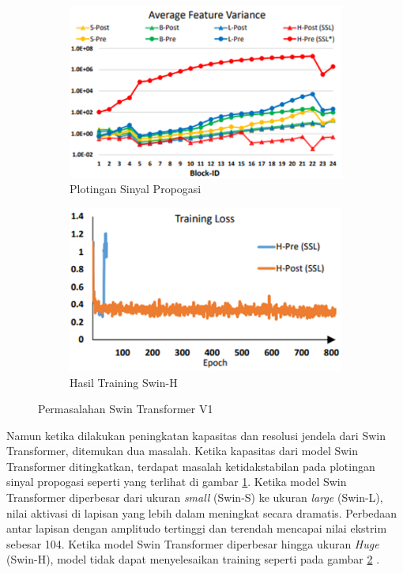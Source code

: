 \begin{figure}[h!]
  \centering
  \begin{subfigure}{.5\textwidth}
    \centering
    \includegraphics[width=.9\linewidth]{gambar/issue1SwinV1.png}
    \caption{Plotingan Sinyal Propogasi}
    \label{fig:plotingansinyalpropogasi}
  \end{subfigure}%
  \begin{subfigure}{.5\textwidth}
    \centering
    \includegraphics[width=.9\linewidth]{gambar/Issue2SwinV1.png}
    \caption{Hasil Training Swin-H}
    \label{fig:hasiltrainingswinh}
  \end{subfigure}
  \caption{Permasalahan Swin Transformer V1}
  \label{fig:permasalahanswintransformerv1}
\end{figure}

Namun ketika dilakukan peningkatan kapasitas dan resolusi jendela dari Swin \linebreak Transformer, ditemukan dua masalah. Ketika kapasitas dari model Swin Transformer \linebreak ditingkatkan, terdapat masalah ketidakstabilan 
pada plotingan sinyal propogasi seperti yang terlihat di gambar \ref{fig:plotingansinyalpropogasi}. Ketika model Swin Transformer diperbesar dari ukuran \emph{small} (Swin-S) ke ukuran \emph{large} (Swin-L), nilai aktivasi di lapisan 
yang lebih dalam meningkat secara dramatis. Perbedaan antar lapisan dengan amplitudo tertinggi dan terendah mencapai nilai ekstrim sebesar 104. Ketika model Swin Transformer diperbesar hingga ukuran 
\emph{Huge} (Swin-H), model tidak dapat menyelesaikan training seperti pada gambar \ref{fig:hasiltrainingswinh} \parencite{Liuv22021}.

